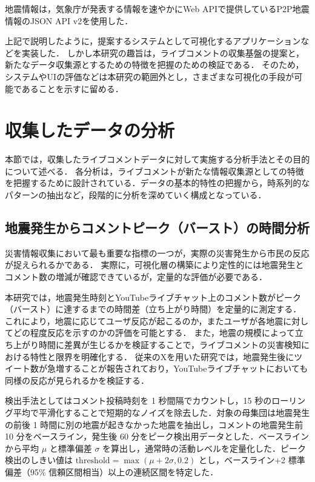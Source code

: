   地震情報は，気象庁が発表する情報を速やかにWeb APIで提供しているP2P地震情報\cite{p2p_earthquake_api}のJSON API v2を使用した．

  上記で説明したように，提案するシステムとして可視化するアプリケーションなどを実装した．
  しかし本研究の趣旨は，ライブコメントの収集基盤の提案と，新たなデータ収集源とするための特徴を把握のための検証である．
  そのため，システムやUIの評価などは本研究の範囲外とし，さまざまな可視化の手段が可能であることを示すに留める．
  
  \section{収集したデータの分析}
  
  本節では，収集したライブコメントデータに対して実施する分析手法とその目的について述べる．
  各分析は，ライブコメントが新たな情報収集源としての特徴を把握するために設計されている．データの基本的特性の把握から，時系列的なパターンの抽出など，段階的に分析を深めていく構成となっている．


  \subsection{地震発生からコメントピーク（バースト）の時間分析}
  
  災害情報収集において最も重要な指標の一つが，実際の災害発生から市民の反応が捉えられるかである．
  実際に，可視化層の構築により定性的には地震発生とコメント数の増減が確認できているが，定量的な評価が必要である．
  
  本研究では，地震発生時刻とYouTubeライブチャット上のコメント数がピーク（バースト）に達するまでの時間差（立ち上がり時間）を定量的に測定する．
  これにより，地震に応じてユーザ反応が起こるのか，またユーザが各地震に対してどの程度反応を示すのかの評価を可能とする．
  また，地震の規模によって立ち上がり時間に差異が生じるかを検証することで，ライブコメントの災害検知における特性と限界を明確化する．
  従来のXを用いた研究では，地震発生後にツイート数が急増することが報告されており\cite{earle2011twitter}，YouTubeライブチャットにおいても同様の反応が見られるかを検証する．

  検出手法としてはコメント投稿時刻を 1 秒間隔でカウントし，15 秒のローリング平均で平滑化することで短期的なノイズを除去した．対象の母集団は地震発生の前後 1 時間に別の地震が起きなかった地震を抽出し，コメントの地震発生前 10 分をベースライン，発生後 60 分をピーク検出用データとした．ベースラインから平均 $\mu$ と標準偏差 $\sigma$ を算出し，通常時の活動レベルを定量化した．ピーク検出のしきい値は $\text{threshold} = \max(\mu + 2\sigma, 0.2)$ とし，ベースライン+2 標準偏差（95\% 信頼区間相当）以上の連続区間を特定した\cite{li2022live_chat_spam}．

